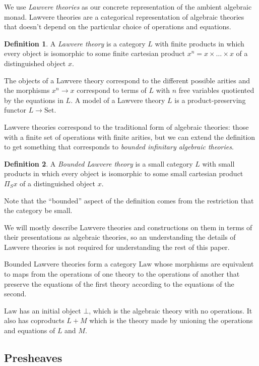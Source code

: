 \documentclass[acmsmall, screen, review, anonymous]{acmart}
\theoremstyle{definition}
\newtheorem{definition}{Definition}[section]
\newcommand{\setc}{\mathrm{Set}}
\newcommand{\initial}{\bot}
\newcommand{\lawc}{\mathrm{Law}}
\begin{document}
We use \emph{Lawvere theories} as our concrete representation of the
ambient algebraic monad. Lawvere theories are a categorical
representation of algebraic theories that doesn't depend on the
particular choice of operations and equations.

\begin{definition}
  A \emph{Lawvere theory} is a category $L$ with finite products in
  which every object is isomorphic to some finite cartesian product
  $x^n = x \times \ldots \times x$ of a distinguished object $x$.
\end{definition}
The objects of a Lawvere theory correspond to the different possible
arities and the morphisms $x^n \rightarrow x$ correspond to terms
of $L$ with $n$ free variables quotiented by the equations in $L$. A
model of a Lawvere theory $L$ is a product-preserving functor
$L \rightarrow \setc$.

Lawvere theories correspond to the traditional form of algebraic
theories: those with a finite set of operations with finite arities, but
we can extend the definition to get something that corresponds to
\emph{bounded infinitary algebraic theories}.
\begin{definition}
  A \emph{Bounded Lawvere theory} is a small category $L$ with small
  products in which every object is isomorphic to some small cartesian
  product $\Pi_S x$ of a distinguished object $x$.
\end{definition}
Note that the ``bounded'' aspect of the definition comes from the
restriction that the category be small.

We will mostly describe Lawvere theories and constructions on them in
terms of their presentations as algebraic theories, so an understanding
the details of Lawvere theories is not required for understanding the
rest of this paper.

Bounded Lawvere theories form a category $\lawc$ whose morphisms are
equivalent to maps from the operations of one theory to the operations
of another that preserve the equations of the first theory according to
the equations of the second.

$\lawc$ has an initial object $\initial$, which is the algebraic theory
with no operations. It also has coproducts $L + M$ which is the theory
made by unioning the operations and equations of $L$ and $M$.

\subsection{Presheaves}
\end{document}
